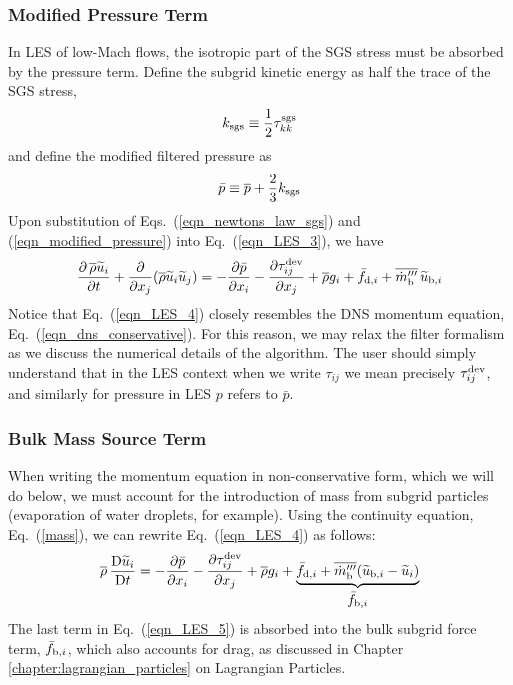 \subsubsection*{Modified Pressure Term}

In LES of low-Mach flows, the isotropic part of the SGS stress must be absorbed by the pressure term.  Define the subgrid kinetic energy as half the trace of the SGS stress,
\begin{equation}
\label{eqn_ksgs_2}
k_{\rm sgs} \equiv \frac{1}{2} \tau_{kk}^{\rm sgs}
\end{equation}
and define the modified filtered pressure \cite{Pope:2000} as
\begin{equation}
\label{eqn_modified_pressure}
\bar{p} \equiv \overline{p} + \frac{2}{3}k_{\rm sgs}
\end{equation}
Upon substitution of Eqs.~(\ref{eqn_newtons_law_sgs}) and (\ref{eqn_modified_pressure}) into Eq.~(\ref{eqn_LES_3}), we have
\begin{equation}
\label{eqn_LES_4}
\frac{\partial \,\overline{\rho} \widetilde{u}_i}{\partial t} + \frac{\partial}{\partial x_j} (\overline{\rho} \widetilde{u}_i \widetilde{u}_j) = -\frac{\partial \bar{p}}{\partial x_i} - \frac{\partial \tau_{ij}^{\rm dev}}{\partial x_j} + \overline{\rho} g_i + \bar{f}_{{\rm d},i} + \overline{\dot{m}_{\rm b}^{\prime\prime\prime}} \, \widetilde{u}_{{\rm b},i}
\end{equation}
Notice that Eq.~(\ref{eqn_LES_4}) closely resembles the DNS momentum equation, Eq.~(\ref{eqn_dns_conservative}).  For this reason, we may relax the filter formalism as we discuss the numerical details of the algorithm.  The user should simply understand that in the LES context when we write $\tau_{ij}$ we mean precisely $\tau_{ij}^{\rm dev}$, and similarly for pressure in LES $p$ refers to $\bar{p}$.

\subsubsection*{Bulk Mass Source Term}

When writing the momentum equation in non-conservative form, which we will do below, we must account for the introduction of mass from subgrid particles (evaporation of water droplets, for example).  Using the continuity equation, Eq.~(\ref{mass}), we can rewrite Eq.~(\ref{eqn_LES_4}) as follows:
\begin{equation}
\label{eqn_LES_5}
\overline{\rho} \,\frac{\mathrm{D} \widetilde{u}_i}{\mathrm{D} t} = -\frac{\partial \bar{p}}{\partial x_i} - \frac{\partial \tau_{ij}^{\rm dev}}{\partial x_j} + \overline{\rho} g_i + \underbrace{\bar{f}_{{\rm d},i} + \overline{\dot{m}_{\rm b}^{{\prime\prime\prime}}} (\widetilde{u}_{{\rm b},i} - \widetilde{u}_i)}_{\displaystyle\bar{f}_{{\rm b},i}}
\end{equation}
The last term in Eq.~(\ref{eqn_LES_5}) is absorbed into the bulk subgrid force term, $\bar{f}_{{\rm b},i}$, which also accounts for drag, as discussed in Chapter \ref{chapter:lagrangian_particles} on Lagrangian Particles.

